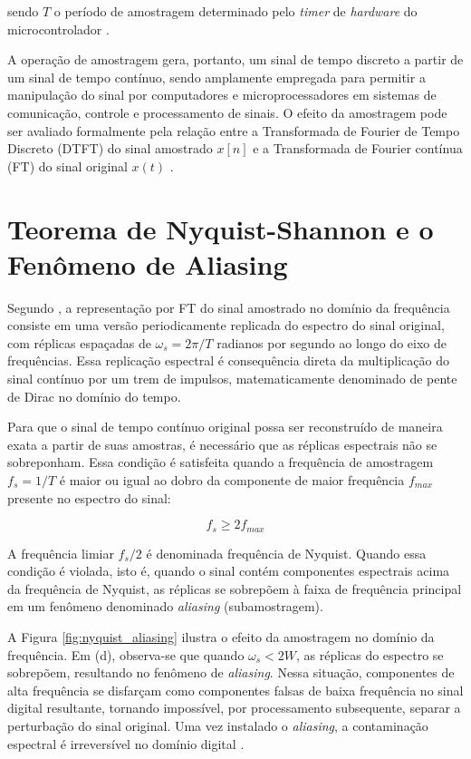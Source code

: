 sendo $T$ o período de amostragem determinado pelo \textit{timer} de \textit{hardware} do microcontrolador \cite{Haykin2001}.

A operação de amostragem gera, portanto, um sinal de tempo discreto a partir de um sinal de tempo contínuo, sendo amplamente empregada para permitir a manipulação do sinal por computadores e microprocessadores em sistemas de comunicação, controle e processamento de sinais. O efeito da amostragem pode ser avaliado formalmente pela relação entre a Transformada de Fourier de Tempo Discreto (DTFT) do sinal amostrado $x[n]$ e a Transformada de Fourier contínua (FT) do sinal original $x(t)$ \cite{Haykin2001}.

\section{Teorema de Nyquist-Shannon e o Fenômeno de Aliasing}
Segundo , a representação por FT do sinal amostrado no domínio da frequência consiste em uma versão periodicamente replicada do espectro do sinal original, com réplicas espaçadas de $\omega_{s}=2\pi/T$ radianos por segundo ao longo do eixo de frequências. Essa replicação espectral é consequência direta da multiplicação do sinal contínuo por um trem de impulsos, matematicamente denominado de pente de Dirac no domínio do tempo.

Para que o sinal de tempo contínuo original possa ser reconstruído de maneira exata a partir de suas amostras, é necessário que as réplicas espectrais não se sobreponham. Essa condição é satisfeita quando a frequência de amostragem $f_{s}=1/T$ é maior ou igual ao dobro da componente de maior frequência $f_{max}$ presente no espectro do sinal:

\begin{equation}
    f_{s} \ge 2f_{max}
\end{equation}

A frequência limiar $f_{s}/2$ é denominada frequência de Nyquist. Quando essa condição é violada, isto é, quando o sinal contém componentes espectrais acima da frequência de Nyquist, as réplicas se sobrepõem à faixa de frequência principal em um fenômeno denominado \textit{aliasing} (subamostragem). 

A Figura \ref{fig:nyquist_aliasing} ilustra o efeito da amostragem no domínio da frequência. Em (d), observa-se que quando $\omega_{s}<2W$, as réplicas do espectro se sobrepõem, resultando no fenômeno de \textit{aliasing}. Nessa situação, componentes de alta frequência se disfarçam como componentes falsas de baixa frequência no sinal digital resultante, tornando impossível, por processamento subsequente, separar a perturbação do sinal original. Uma vez instalado o \textit{aliasing}, a contaminação espectral é irreversível no domínio digital \cite{Haykin2001}.

